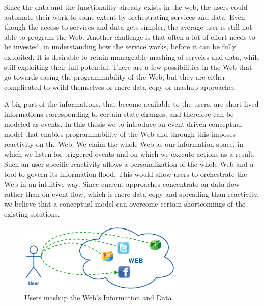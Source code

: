 Since the data and the functionality already exists in the web, the users could automate their work to some extent by orchestrating services and data.
Even though the access to services and data gets simpler, the average user is still not able to program the Web.
Another challenge is that often a lot of effort needs to be invested, in understanding how the service works, before it can be fully exploited.
It is desirable to retain manageable mashing of servcies and data, while still exploiting their full potential.
There are a few possibilities in the Web that go towards easing the programmability of the Web, but they are either complicated to weild themselves or mere data copy or mashup approaches.

A big part of the informations, that become available to the users, are short-lived informations corresponding to certain state changes, and therefore can be modeled as events.
In this thesis we to introduce an event-driven conceptual model that enables programmability of the Web and through this imposes reactivity on the Web.
We claim the whole Web as our information space, in which we listen for triggered events and on which we execute actions as a result.
Such an user-specific reactivity allows a personalization of the whole Web and a tool to govern its information flood.
This would allow users to orchestrate the Web in an intuitive way.
Since current approaches concentrate on data flow rather than on event flow, which is mere data copy and spreading than reactivity, we believe that a conceptual model can overcome certain shortcomings of the existing solutions. %

\begin{figure}[!ht]
  \centering
  \includegraphics[width=0.7\textwidth]{figures/UsersWeildServicesInTheWeb}
  \caption{Users mashup the Web's Information and Data}
  \label{fig:UsersWeildServicesInTheWeb}
\end{figure}


